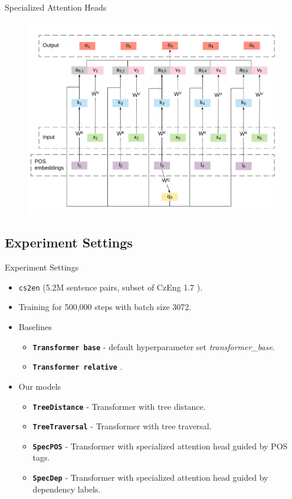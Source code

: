 \documentclass{beamer}
\def\cs2en{\texttt{cs2en}\xspace}
\def\transformer{Transformer\xspace}
\def\transformerbase{\texttt{Transformer base}\xspace}
\def\transformerrel{\texttt{Transformer relative}\xspace}
\def\TreeDistance{\texttt{TreeDistance}\xspace}
\def\TreeTraversal{\texttt{TreeTraversal}\xspace}
\def\SpecPOS{\texttt{SpecPOS}\xspace}
\def\SpecDep{\texttt{SpecDep}\xspace}
\begin{document}

\begin{frame}{Specialized Attention Heads}
\begin{figure}[t]
    \centering
    \includegraphics[width=0.7\linewidth]{img/specialized-head.pdf}
\end{figure}
\end{frame}

\subsection{Experiment Settings}

\begin{frame}{Experiment Settings}
\begin{itemize}
    \item \cs2en (5.2M sentence pairs, subset of CzEng 1.7 \citep{czeng16:2016}).
    \item Training for 500,000 steps with batch size 3072.
    \item Baselines
        \begin{itemize}
            \item \textbf{\transformerbase} - default hyperparameter set \textit{transformer\_base}.
            \item \textbf{\transformerrel} \citep{DBLP:conf/naacl/ShawUV18}.
        \end{itemize}
    \item Our models
    \begin{itemize}
        \item \textbf{\TreeDistance} - \transformer with tree distance.
        \item \textbf{\TreeTraversal} - \transformer with tree traversal.
        \item \textbf{\SpecPOS} - \transformer with specialized attention head guided by POS tags.
        \item \textbf{\SpecDep} - \transformer with specialized attention head guided by dependency labels.
    \end{itemize}
\end{itemize}
\end{frame}
\end{document}
